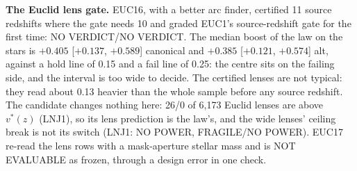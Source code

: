 \documentclass[10pt]{article}
\begin{document}
\textbf{The Euclid lens gate.} EUC16, with a better arc finder, certified 11 source redshifts where the gate needs 10 and graded EUC1's source-redshift gate for the first time: NO VERDICT/NO VERDICT. The median boost of the law on the stars is $+0.405$ [$+0.137$, $+0.589$] canonical and $+0.385$ [$+0.121$, $+0.574$] alt, against a hold line of 0.15 and a fail line of 0.25: the centre sits on the failing side, and the interval is too wide to decide. The certified lenses are not typical: they read about 0.13 heavier than the whole sample before any source redshift. The candidate changes nothing here: 26/0 of 6,173 Euclid lenses are above $v^*(z)$ (LNJ1), so its lens prediction is the law's, and the wide lenses' ceiling break is not its switch (LNJ1: NO POWER, FRAGILE/NO POWER). EUC17 re-read the lens rows with a mask-aperture stellar mass and is NOT EVALUABLE as frozen, through a design error in one check.
\end{document}
